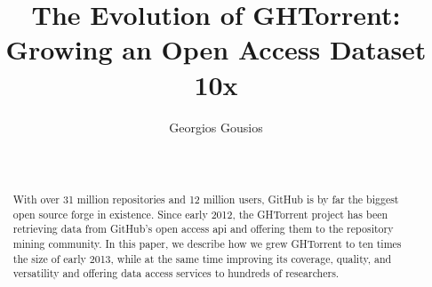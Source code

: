\documentclass{sig-alternate}
\begin{document}






%

\title{The Evolution of GHTorrent: Growing an Open Access Dataset 10x}
%
\author{
%
\alignauthor Georgios Gousios\\
       \\
       \\
}

\maketitle
\begin{abstract}

With over 31 million repositories and 12 million users, GitHub is by far the
biggest open source forge in existence. Since early 2012, the GHTorrent project
has been retrieving data from GitHub's open access {\sc api} and offering them
to the repository mining community. In this paper, we describe how we grew
GHTorrent to ten times the size of early 2013, while at the same time improving
its coverage, quality, and versatility and offering data access services to
hundreds of researchers.

\end{abstract}
\end{document}
